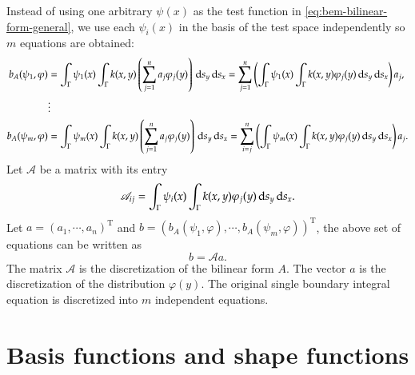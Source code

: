 \documentclass[11pt, a4paper]{book}
\begin{document}
Instead of using one arbitrary $\psi(x)$ as the test function in
\eqref{eq:bem-bilinear-form-general}, we use each $\psi_i(x)$ in the basis of the test
space independently so $m$ equations are obtained:
\begin{equation}
  \begin{aligned}
    b_A(\psi_1,\varphi) &=
    \int_{\Gamma}\psi_1(x)\int_{\Gamma}k(x,y) \left( \sum_{j=1}^n a_j\varphi_j(y) \right) \,\mathrm{d} s_y \,\mathrm{d}
    s_x = \sum_{j=1}^n \left( \int_{\Gamma}\psi_1(x)\int_{\Gamma}k(x,y) \varphi_j(y) \,\mathrm{d} s_y
    \,\mathrm{d} s_x  \right) a_j, \\
    &\vdots \\
    b_A(\psi_m,\varphi) &=
    \int_{\Gamma}\psi_m(x)\int_{\Gamma}k(x,y) \left( \sum_{j=1}^na_j\varphi_j(y) \right) \,\mathrm{d} s_y \,\mathrm{d}
    s_x = \sum_{i=j}^n \left( \int_{\Gamma}\psi_m(x)\int_{\Gamma}k(x,y) \varphi_j(y) \,\mathrm{d} s_y
    \,\mathrm{d} s_x  \right) a_j.
  \end{aligned}
\end{equation}
Let $\mathscr{A}$ be a matrix with its entry
\begin{equation}
  \label{eq:bilinear-form-matrix-entry}
  \mathscr{A}_{ij} = \int_{\Gamma} \psi_i(x) \int_{\Gamma} k(x,y)\varphi_j(y) \,\mathrm{d} s_y
  \,\mathrm{d} s_x.
\end{equation}
Let $a=(a_1,\cdots,a_n)^{\mathrm{T}}$ and
$b=(b_A(\psi_1,\varphi),\cdots,b_A(\psi_m,\varphi))^{\mathrm{T}}$, the above set of
equations can be written as
\begin{equation}
  b = \mathscr{A} a.
\end{equation}
The matrix $\mathscr{A}$ is the discretization of the bilinear form $A$. The vector $a$ is
the discretization of the distribution $\varphi(y)$. The original single boundary integral
equation is discretized into $m$ independent equations.

\section{Basis functions and shape functions}
\end{document}
